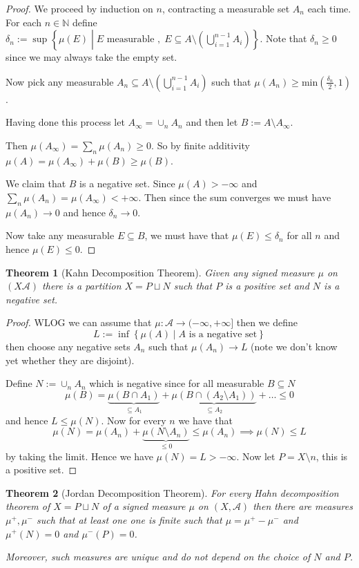 \documentclass[11pt]{article}
\newcommand{\defeq}{:=}
\newcommand{\relmiddle}[1]{\mathrel{}\middle#1\mathrel{}}
\newcommand{\rmv}{\relmiddle|}
\newcommand{\N}{\mathbb{N}}
\newtheorem{theorem}{Theorem}[section]
\begin{document}
\begin{proof}
We proceed by induction on $n$, contracting a measurable set $A_n$ each time.
For each $n\in\N$ define $\delta_n\defeq\sup\left\{\mu(E) \rmv E\text{ measurable },\; E\subseteq A\setminus\left(\bigcup_{i=1}^{n-1}A_i\right)\right\}$.
Note that $\delta_n\geq 0$ since we may always take the empty set.

Now pick any measurable $A_n\subseteq A\setminus\left(\bigcup_{i=1}^{n-1} A_i \right)$ such that $\mu(A_n)\geq\text{min}(\frac{\delta_n}{2},1)$.

Having done this process let $A_\infty=\cup_n A_n$ and then let $B\defeq A\setminus A_\infty$.

Then $\mu(A_\infty)=\sum_n\mu(A_n)\geq 0$. So by finite additivity $\mu(A)=\mu(A_\infty)+\mu(B)\geq\mu(B)$.

We claim that $B$ is a negative set.
Since $\mu(A) > -\infty$ and $\sum_n \mu(A_n)=\mu(A_\infty) < +\infty$.
Then since the sum converges we must have $\mu(A_n)\to 0$ and hence $\delta_n \to 0$.

Now take any measurable $E\subseteq B$, we must have that $\mu(E) \leq \delta_n$ for all $n$ and hence $\mu(E) \leq 0$.
\end{proof}

\begin{theorem}[Kahn Decomposition Theorem]
Given any signed measure $\mu$ on $(X \mathcal{A})$ there is a partition $X=P\sqcup N$ such that $P$ is a positive set and $N$ is a negative set.
\end{theorem}

\begin{proof}
WLOG we can assume that $\mu:\mathcal{A}\to (-\infty, +\infty]$ then we define
\[
	L\defeq\inf\left\{\mu(A) \rmv A \text{ is a negative set}\right\}
\]
then choose any negative sets $A_n$ such that $\mu(A_n)\to L$ (note we don't know yet whether they are disjoint).

Define $N\defeq\cup_n A_n$ which is negative since for all measurable $B\subseteq N$
\[
	\mu(B) = \underbrace{\mu(B\cap A_1)}_{\subseteq A_1} + \underbrace{\mu(B \cap (A_2 \setminus A_1))}_{\subseteq A_2} + \dots \leq 0
\]
and hence $L \leq \mu(N)$.
Now for every $n$ we have that
\[
	\mu(N) = \mu(A_n) + \underbrace{\mu(N\setminus A_n)}_{\leq 0} \leq \mu(A_n) \implies \mu(N) \leq L
\]
by taking the limit.
Hence we have $\mu(N)=L > -\infty$.
Now let $P= X \setminus n$, this is a positive set.
\end{proof}

\begin{theorem}[Jordan Decomposition Theorem]
For every Hahn decomposition theorem of $X=P\sqcup N$ of a signed measure $\mu$ on $(X, \mathcal{A})$ then there are measures $\mu^+, \mu^-$ such that at least one one is finite such that $\mu=\mu^+ - \mu^-$ and $\mu^+(N)=0$ and $\mu^-(P)=0$.

Moreover, such measures are unique and do not depend on the choice of $N$ and $P$.
\end{theorem}
\end{document}
